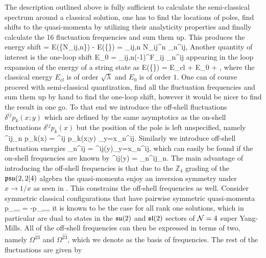 The description outlined above is fully sufficient to calculate the semi-classical spectrum around a classical solution, one has to find the locations of poles, find shifts to the quasi-momenta by utilizing their analyticity properties and finally calculate the 16 fluctuation frequencies and sum them up. 
This produces the energy shift
\beq
\delta \Delta = E(\{N_{ij,n}\}) - E(\{\}) = \sum_{ij,n} N_{ij}^n \Omega_n^{ij},
\eeq
Another quantity of interest is the one-loop shift
\beq
	\label{eq:one_loop_shift}
	E_0 =  \sum_{ij,n}(-1)^{F_{ij}} \Omega_n^{ij}
\eeq
appearing in the loop expansion of the energy of a string state as
\beq
	E(\{\}) = E_{cl} + E_0 + ,
\eeq
where the classical energy $E_{cl}$ is of order $\sqrt{\lambda}$ and $E_0$ is of order $1$.
One can of course proceed with semi-classical quantization, find all the fluctuation frequencies and sum them up by hand to find the one-loop shift, however it would be nicer to find the result in one go.
To that end we introduce the off-shell fluctuations $\delta^{ij} p_k(x;y)$ which are defined by the same asymptotics as the on-shell fluctuations $\delta^{ij} p_k(x)$ but the position of the pole is left unspecified, namely
\beq
	\delta^{ij}_n p_k(x) = \delta^{ij} p_k(x;y) \vert_{y=x_n^{ij}}.
\eeq
Similarly we introduce off-shell fluctuation energies
\beq
	\Omega_n^{ij} = \Omega^{ij}(y)\vert_{y=x_n^{ij}},
\eeq
which can easily be found if the on-shell frequencies are known by
\beq
	\label{eq:off_shell_freq}
	\Omega^{ij}(y) = \Omega_n^{ij}\vert_{n\rightarrow {}}.
\eeq
The main advantage of introducing the off-shell frequencies is that due to the $\mathbb{Z}_4$ grading of the $\mathfrak{psu}(2,2|4)$ algebra the quasi-momenta enjoy an inversion symmetry under $x \rightarrow 1/x$ as seen in .
This constrains the off-shell frequencies as well.
Consider symmetric classical configurations that have pairwise symmetric quasi-momenta
\beq
	p_{,,,} = -p_{,,,},
\eeq
it is known to be the case for all rank one solutions, which in particular are dual to states in the $\mathfrak{su}(2)$ and $\mathfrak{sl}(2)$ sectors of $\mathcal{N}=4$ super Yang-Mills. 
All of the off-shell frequencies can then be expressed in terms of two, namely $\Omega^{\tilde2 \tilde3}$ and $\Omega^{\hat2 \hat3}$, which we denote as the basis of frequencies.
The rest of the fluctuations are given by
\beq
